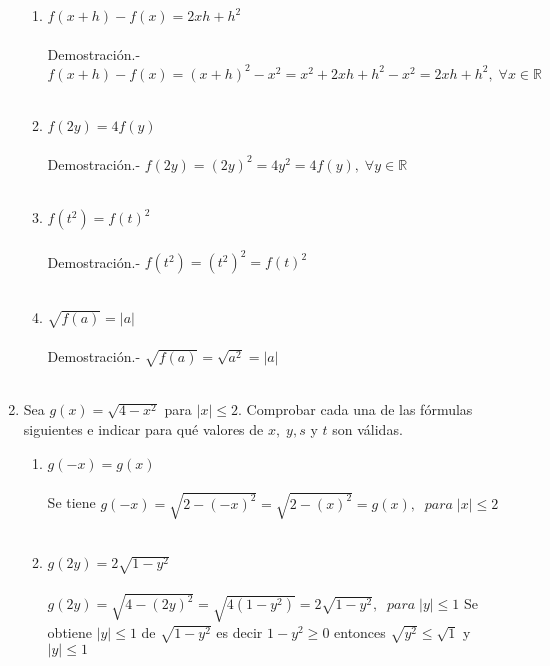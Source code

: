 \begin{enumerate}[ \bfseries 1.]
\begin{enumerate}[\bfseries (a)]
                \item $f(x+h) - f(x) = 2xh + h^2$\\\\
                Demostración.- \; $f(x+h) - f(x) = (x+h)^2 -x^2 = x^2 + 2xh +h^2 - x^2 = 2xh + h^2, \; \forall x \in \mathbb{R}$\\\\

                \item $f(2y) = 4f(y)$\\\\
                Demostración.- \; $f(2y) = (2y)^2 = 4y^2 = 4 f(y), \; \forall y \in \mathbb{R}$\\\\
                \item $f(t^2)=f(t)^2$\\\\
                Demostración.- \; $f(t^2) = (t^2)^2 = f(t)^2$\\\\
                \item $\sqrt{f(a)} = |a|$\\\\
                Demostración.- \; $\sqrt{f(a)} = \sqrt{a^2} = |a|$\\\\
            \end{enumerate}

        \item Sea $g(x) = \sqrt{4-x^2}$ para $|x| \leq 2$. Comprobar cada una de las fórmulas siguientes e indicar para qué valores de $x, \; y, s$ y $t$ son válidas.
            \begin{enumerate}[\bfseries (a)]
                \item $g(-x) = g(x)$\\\\
                Se tiene $g(-x)=\sqrt{2-(-x)^2} = \sqrt{2-(x)^2} = g(x), \; \; para \; |x| \leq 2$\\\\

                \item $g(2y) = 2\sqrt{1-y^2}$\\\\
                $g(2y)=\sqrt{4-(2y)^2}= \sqrt{4(1-y^2)} = 2 \sqrt{1-y^2}, \; \; para \; |y|\leq 1$ Se obtiene $|y| \leq 1$  de $\sqrt{1-y^2}$ es decir $1-y^2 \geq 0$ entonces $\sqrt{y^2} \leq \sqrt{1}$ \; y \; $|y|\leq 1$\\\\


\end{enumerate}
\end{enumerate}
